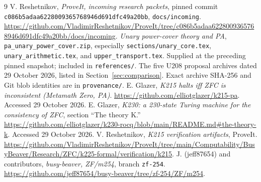 \documentclass[11pt,a4paper]{article}
\theoremstyle{definition}
\newcommand{\file}[1]{\nolinkurl{#1}}
\newcommand{\snapshot}{\nolinkurl{c086b5adaa6228009365768946d691dfc49a20bb}}
\begin{document}
\begin{thebibliography}{9}
 V. Reshetnikov, \emph{ProveIt, incoming research packets}, pinned commit \snapshot, \file{docs/incoming}.\newline
\url{https://github.com/VladimirReshetnikov/ProveIt/tree/c086b5adaa6228009365768946d691dfc49a20bb/docs/incoming}.
 \emph{Unary power-cover theory and PA}, \file{pa_unary_power_cover.zip}, especially \file{sections/unary_core.tex}, \file{unary_arithmetic.tex}, and \file{upper_transport.tex}. Supplied at the preceding pinned snapshot; included in \file{references/}.
 The five U208 proposal archives dated 29 October 2026, listed in Section~\ref{sec:comparison}. Exact archive SHA-256 and Git blob identities are in \file{provenance/}.
 E. Glazer, \emph{K215 halts iff ZFC is inconsistent (Metamath Zero, PA)}.\newline
\url{https://github.com/elliotglazer/k215-pa}. Accessed 29 October 2026.
 E. Glazer, \emph{K230: a 230-state Turing machine for the consistency of ZFC}, section ``The theory K.''\newline
\url{https://github.com/elliotglazer/k230-rocq/blob/main/README.md#the-theory-k}. Accessed 29 October 2026.
 V. Reshetnikov, \emph{K215 verification artifacts}, ProveIt.\newline
\url{https://github.com/VladimirReshetnikov/ProveIt/tree/main/Computability/BusyBeaver/Research/ZFC/k225-formal/verification/k215}.
 J. (jeff87654) and contributors, \emph{busy-beaver, ZF/m254}, branch \file{zf-254}.\newline
\url{https://github.com/jeff87654/busy-beaver/tree/zf-254/ZF/m254}.
\end{thebibliography}
\end{document}
